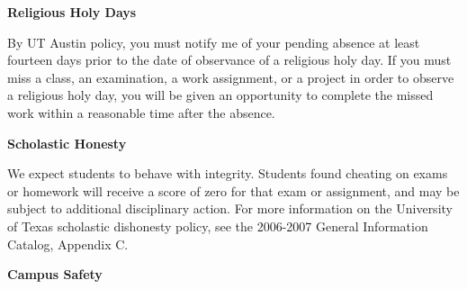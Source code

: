 \documentclass[11pt]{article}
\begin{document}
\vspace{3mm}
\textbf{\large Religious Holy Days}

By UT Austin policy, you must notify me of your pending absence at least fourteen days prior to the date of observance of a religious holy day.  If you must miss a class, an examination, a work assignment, or a project in order to observe a religious holy day, you will be given an opportunity to complete the missed work within a reasonable time after the absence.

\vspace{3mm}
\textbf{\large Scholastic Honesty}

We expect students to behave with integrity.  Students found cheating on exams or homework will receive a score of zero for that exam or assignment, and may be subject to additional disciplinary action. For more information on the University of Texas scholastic dishonesty policy, see the 2006-2007 General Information Catalog, Appendix C.


\vspace{3mm}
\textbf{\large Campus Safety}
\end{document}

